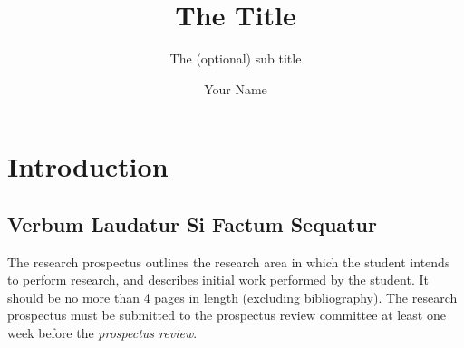 \documentclass[]{usiinfprospectus}
\author{Your Name}
\title{The Title}
\subtitle{The (optional) sub title}
\begin{document}
\maketitle

\section{Introduction} \label{introduction}

\subsection{Verbum Laudatur Si Factum Sequatur}

The research prospectus outlines the research area in which the student intends to perform research, and describes initial work performed by the student. It should be no more than 4 pages in length (excluding bibliography). The research prospectus must be submitted to the prospectus review committee at least one week before the {\em prospectus review}.



\end{document}
